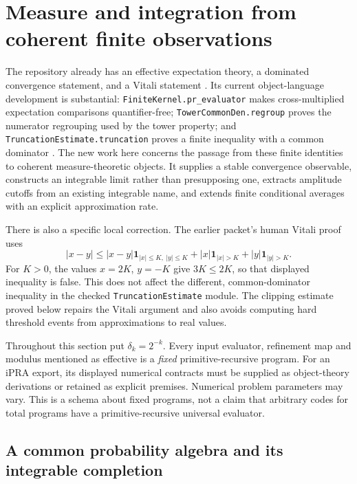 \section{Measure and integration from coherent finite observations}
\label{sec:measure}

The repository already has an effective expectation theory, a dominated
convergence statement, and a Vitali statement
\cite{repo-expectation-packet}.  Its current object-language development is
substantial: \texttt{FiniteKernel.pr\_evaluator} makes cross-multiplied
expectation comparisons quantifier-free; \texttt{TowerCommonDen.regroup}
proves the numerator regrouping used by the tower property; and
\texttt{TruncationEstimate.truncation} proves a finite inequality with a
common dominator
\cite{repo-finite-kernel,repo-tower-common-den,repo-truncation}.
The new work here concerns the passage from these finite identities to
coherent measure-theoretic objects.  It supplies a stable convergence
observable, constructs an integrable limit rather than presupposing one,
extracts amplitude cutoffs from an existing integrable name, and extends
finite conditional averages with an explicit approximation rate.

There is also a specific local correction.  The earlier packet's human
Vitali proof uses
\[
 |x-y|\le |x-y|\mathbf1_{|x|\le K,\ |y|\le K}
       +|x|\mathbf1_{|x|>K}+|y|\mathbf1_{|y|>K}.
\]
For $K>0$, the values $x=2K$, $y=-K$ give $3K\le2K$, so that displayed
inequality is false.  This does not affect the different, common-dominator
inequality in the checked \texttt{TruncationEstimate} module.  The clipping
estimate proved below repairs the Vitali argument and also avoids computing
hard threshold events from approximations to real values.

Throughout this section put $\delta_k=2^{-k}$.  Every input evaluator,
refinement map and modulus mentioned as effective is a \emph{fixed}
primitive-recursive program. For an iPRA export, its displayed numerical
contracts must be supplied as object-theory derivations or retained as
explicit premises. Numerical problem parameters may vary. This is a
schema about fixed programs, not a claim that arbitrary codes for total
programs have a primitive-recursive universal evaluator.

\subsection{A common probability algebra and its integrable completion}

